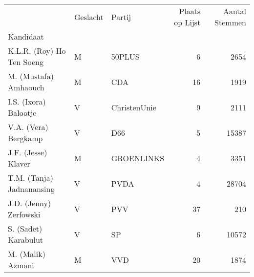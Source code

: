 \begin{tabular}{lllrr}
\toprule
{} & Geslacht &        Partij &  Plaats op Lijst &  Aantal Stemmen \\
Kandidaat                 &          &               &                  &                           \\
\midrule
K.L.R. (Roy) Ho Ten Soeng &        M &        50PLUS &                6 &                      2654 \\
M. (Mustafa) Amhaouch     &        M &           CDA &               16 &                      1919 \\
I.S. (Ixora) Balootje     &        V &  ChristenUnie &                9 &                      2111 \\
V.A. (Vera) Bergkamp      &        V &           D66 &                5 &                     15387 \\
J.F. (Jesse) Klaver       &        M &    GROENLINKS &                4 &                      3351 \\
T.M. (Tanja) Jadnanansing &        V &          PVDA &                4 &                     28704 \\
J.D. (Jenny) Zerfowski    &        V &           PVV &               37 &                       210 \\
S. (Sadet) Karabulut      &        V &            SP &                6 &                     10572 \\
M. (Malik) Azmani         &        M &           VVD &               20 &                      1874 \\
\bottomrule
\end{tabular}

